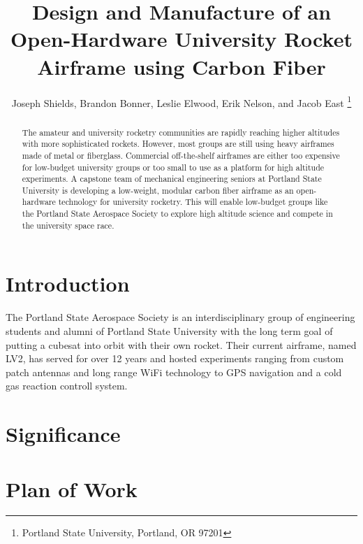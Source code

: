\documentclass{aiaa-tc}%
\title{Design and Manufacture of an Open-Hardware 
 	University Rocket Airframe using Carbon Fiber}
\author{
Joseph Shields, Brandon Bonner, Leslie Elwood, Erik Nelson, and Jacob East
	\thanks{Portland State University, Portland, OR 97201}
 }
\begin{document}
\maketitle

\begin{abstract}
The amateur and university rocketry communities are rapidly reaching higher altitudes with more sophisticated rockets. However, most groups are still using heavy airframes made of metal or fiberglass. Commercial off-the-shelf airframes are either too expensive for low-budget university groups or too small to use as a platform for high altitude experiments. A capstone team of mechanical engineering seniors at Portland State University is developing a low-weight, modular carbon fiber airframe as an open-hardware technology for university rocketry. This will enable low-budget groups like the Portland State Aerospace Society to explore high altitude science and compete in the university space race. 
\end{abstract}

\section{Introduction}
The Portland State Aerospace Society is an interdisciplinary group of engineering students and alumni of Portland State University with the long term goal of putting a cubesat into orbit with their own rocket. 
Their current airframe, named LV2, has served for over 12 years and hosted experiments ranging from custom patch antennas and long range WiFi technology to GPS navigation and a cold gas reaction controll system. 

\section{Significance}


\section{Plan of Work}
\end{document}
